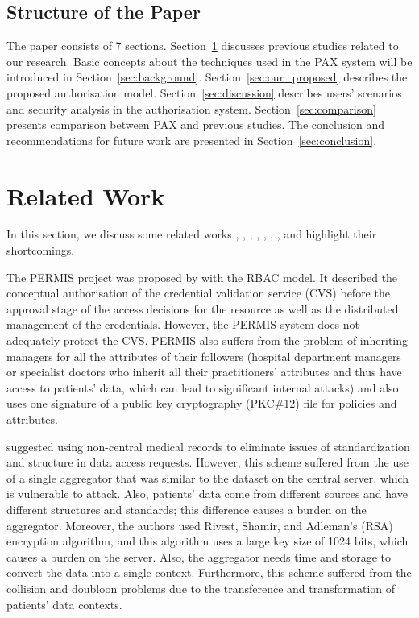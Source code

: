 \documentclass[journal,article,submit,moreauthors,pdftex]{Definitions/mdpi}
\begin{document}
\subsection{Structure of the Paper}
The paper consists of 7 sections. Section~\ref{sec:related_work} discusses previous studies related to our research. Basic concepts about the techniques used in the PAX system will be introduced in Section~\ref{sec:background}. Section~\ref{sec:our_proposed} describes the proposed authorisation model. Section~\ref{sec:discussion} describes users' scenarios and security analysis in the authorisation system. Section~\ref{sec:comparison} presents comparison between PAX and previous studies. The conclusion and recommendations for future work are presented in Section~\ref{sec:conclusion}.

\section{Related Work}
\label{sec:related_work}
In this section, we discuss some related works \cite{fp12}, \cite{fp2}, \cite{fp6}, \cite{fp13}, \cite{fp16}, \cite{fp17}, \cite{fp35}, and highlight their shortcomings.

The PERMIS project was proposed by \cite{fp16} with the RBAC model. It described the conceptual authorisation of the credential validation service (CVS) before the approval stage of the access decisions for the resource as well as the distributed management of the credentials. However, the
PERMIS system does not adequately protect the CVS. PERMIS also suffers from the problem of inheriting managers for all the attributes of their followers (hospital department managers or specialist doctors who inherit all their practitioners' attributes and thus have access to patients' data, which can lead to significant internal attacks) and also uses one signature of a public key cryptography (PKC\#12) file for policies and attributes.

\citet{fp6} suggested using non-central medical records to eliminate issues of standardization and structure in data access requests. However, this scheme suffered from the use of a single aggregator that was similar to the dataset on the central server, which is vulnerable to attack.  Also, patients' data come from different sources and have different structures and standards; this difference causes a burden on the aggregator. Moreover, the authors used Rivest, Shamir, and Adleman's (RSA) encryption algorithm, and this algorithm uses a large key size of 1024 bits, which causes a burden on the server. Also, the aggregator needs time and storage to convert the data into a single context. Furthermore, this scheme suffered from the collision and doubloon problems due to the transference and transformation of patients' data contexts.
\end{document}
